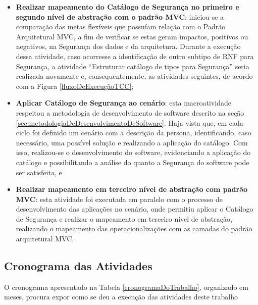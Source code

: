 \begin{itemize}
	\item \textbf{Realizar mapeamento do Catálogo de Segurança no primeiro e segundo nível de abstração com o padrão MVC}: iniciou-se a comparação das metas flexíveis que possuíam relação com o Padrão Arquitetural MVC, a fim de verificar se estas geram impactos, positivos ou negativos, na Segurança dos dados e da arquitetura. Durante a execução dessa atividade, caso ocorresse a identificação de outro subtipo de RNF para Segurança, a atividade “Estruturar catálogo de tipos para Segurança” seria realizada novamente e, consequentemente, as atividades seguintes, de acordo com a Figura \ref{fluxoDeExecuçãoTCC};
	
	\item \textbf{Aplicar Catálogo de Segurança ao cenário}: esta macroatividade respeitou a metodologia de desenvolvimento de software descrito na seção \ref{sec:metodologiaDeDesenvolvimentoDeSoftware}. Haja vista que, em cada ciclo foi definido um cenário com a descrição da persona, identificando, caso necessário, uma possível solução e realizando a aplicação do catálogo. Com isso, realizou-se o desenvolvimento do software, evidenciando a aplicação do catálogo e possibilitando a análise do quanto a Segurança do software pode ser satisfeita, e
	
	\item  \textbf{Realizar mapeamento em terceiro nível de abstração com padrão MVC}: esta atividade foi executada em paralelo com o processo de desenvolvimento das aplicações no cenário, onde permitiu aplicar o Catálogo de Segurança e realizar o mapeamento em terceiro nível de abstração, realizando o mapeamento das operacionalizações com as camadas do padrão arquitetural MVC. 
\end{itemize}


\subsection{Cronograma das Atividades}


O cronograma apresentado na Tabela \ref{cronogramaDoTrabalho}, organizado em meses,  procura expor como se deu a execução das atividades deste trabalho


